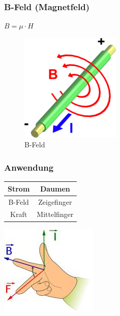 \documentclass[a4paper]{scrartcl}
\begin{document}
\subsubsection{B-Feld (Magnetfeld)}
$B = \mu \cdot H$\\
\begin{figure}[h!]
\begin{center}
\includegraphics[scale=0.5]{images/B-Feld.png}
\caption{B-Feld}
\label{fig:B-Feld}
\end{center}
\end{figure}

\subsubsection{Anwendung}

\begin{center}
\begin{tabular}{|c|c|}

\hline Strom & Daumen \\ 
\hline B-Feld & Zeigefinger \\ 
\hline Kraft & Mittelfinger \\ 
\hline 

\end{tabular} 
\end{center}


\begin{center}
\includegraphics[scale=0.5]{images/handregel.jpg}
\end{center}
\end{document}
